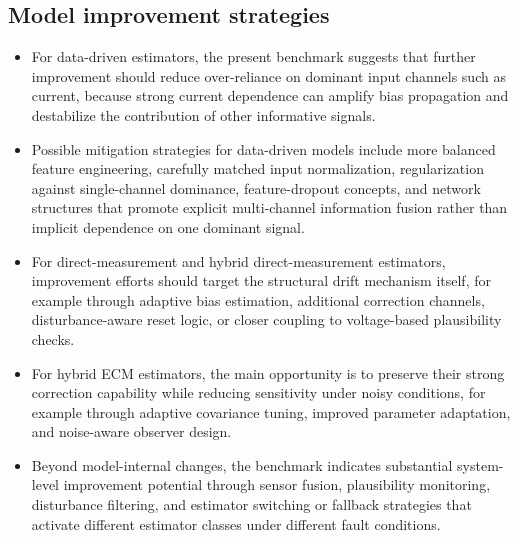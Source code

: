 \documentclass[review,nopreprintline]{elsarticle}
\begin{document}
\subsection{Model improvement strategies}
\begin{itemize}[leftmargin=*]
    \item For data-driven estimators, the present benchmark suggests that further improvement should reduce over-reliance on dominant input channels such as current, because strong current dependence can amplify bias propagation and destabilize the contribution of other informative signals.
    \item Possible mitigation strategies for data-driven models include more balanced feature engineering, carefully matched input normalization, regularization against single-channel dominance, feature-dropout concepts, and network structures that promote explicit multi-channel information fusion rather than implicit dependence on one dominant signal.
    \item For direct-measurement and hybrid direct-measurement estimators, improvement efforts should target the structural drift mechanism itself, for example through adaptive bias estimation, additional correction channels, disturbance-aware reset logic, or closer coupling to voltage-based plausibility checks.
    \item For hybrid ECM estimators, the main opportunity is to preserve their strong correction capability while reducing sensitivity under noisy conditions, for example through adaptive covariance tuning, improved parameter adaptation, and noise-aware observer design.
    \item Beyond model-internal changes, the benchmark indicates substantial system-level improvement potential through sensor fusion, plausibility monitoring, disturbance filtering, and estimator switching or fallback strategies that activate different estimator classes under different fault conditions.
\end{itemize}
\end{document}
